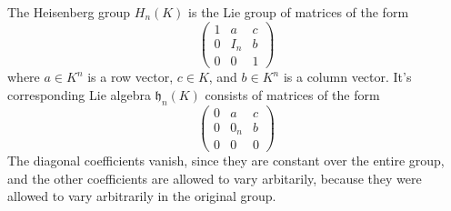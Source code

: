 \begin{example}
    The Heisenberg group $H_n(K)$ is the Lie group of matrices of the form
    \[ \begin{pmatrix} 1 & a & c \\ 0 & I_n & b \\ 0 & 0 & 1 \end{pmatrix} \]
    where $a \in K^n$ is a row vector, $c \in K$, and $b \in K^n$ is a column vector. It's corresponding Lie algebra $\mathfrak{h}_n(K)$ consists of matrices of the form
    \[ \begin{pmatrix} 0 & a & c \\ 0 & 0_n & b \\ 0 & 0 & 0 \end{pmatrix} \]
    The diagonal coefficients vanish, since they are constant over the entire group, and the other coefficients are allowed to vary arbitarily, because they were allowed to vary arbitrarily in the original group.
\end{example}

